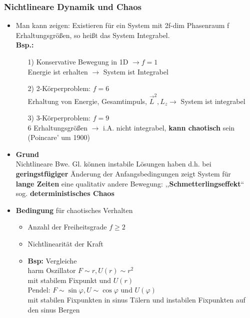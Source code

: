 \documentclass[titlepage,12pt,a4paper,ngerman]{report}
\begin{document}
\subsubsection{Nichtlineare Dynamik und Chaos}
\begin{itemize}
	\item Man kann zeigen: Existieren für ein System mit 2f-dim Phasenraum f Erhaltungsgrößen, so heißt das System Integrabel.\\
	\textbf{Bsp.:}
	\begin{itemize}
		\item[1)] Konservative Bewegung in 1D $\rightarrow f=1$ \\
		Energie ist erhalten $\rightarrow$ System ist Integrabel
		\item[2)] 2-Körperproblem: $f=6$ \\
		Erhaltung von Energie, Gesamtimpuls, $\vec{L}^2, L_z \rightarrow$ System ist integrabel
		\item[3)] 3-Körperproblem: $f=9$\\
		6 Erhaltungsgrößen $\rightarrow$ i.A. nicht integrabel, \textbf{kann chaotisch} sein (Poincare' um 1900)
	\end{itemize}
	\item \textbf{Grund}\\
	Nichtlineare Bwe. Gl. können instabile Lösungen haben d.h. bei \\
	\textbf{geringstfügiger} Änderung der Anfangsbedingungen zeigt System für \\
	\textbf{lange Zeiten} eine qualitativ andere Bewegung: ,,\textbf{Schmetterlingseffekt}`` sog. \textbf{deterministisches Chaos}
	\item \textbf{Bedingung} für chaotisches Verhalten
	\begin{itemize}
		\item Anzahl der Freiheitsgrade $f \ge2$ 
		\item Nichtlinearität der Kraft
		\item \textbf{Bsp:} Vergleiche\\
		harm Oszillator $F\sim r, U(r) \sim r^2$ \\
		mit stabilem Fixpunkt und $U(r)$\\
		Pendel: $F\sim \sin \varphi, U \sim \cos \varphi$ und $ U(\varphi)$ \\
		mit stabilen Fixpunkten in sinus Tälern und instabilen Fixpunkten auf den sinus Bergen
	\end{itemize}
\end{itemize}
\end{document}
